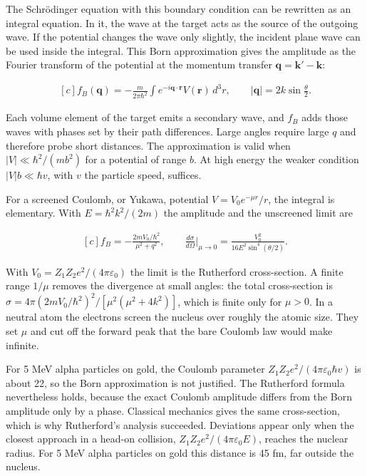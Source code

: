 \documentclass[11pt,oneside]{book}
\newenvironment{centeredalign}{\[\begin{gathered}[c]}{\end{gathered}\]}
\begin{document}
The Schrödinger equation with this boundary condition can be rewritten as an integral equation. In it, the wave at the target acts as the source of the outgoing wave. If the potential changes the wave only slightly, the incident plane wave can be used inside the integral. This Born approximation gives the amplitude as the Fourier transform of the potential at the momentum transfer \(\mathbf q=\mathbf k'-\mathbf k\):

\begin{centeredalign}
f_B(\mathbf q)=-\frac{m}{2\pi\hbar^2}\int e^{-i\mathbf q\cdot\mathbf r}V(\mathbf r)\,d^3r,
\qquad |\mathbf q|=2k\sin\frac\theta2.
\end{centeredalign}

Each volume element of the target emits a secondary wave, and \(f_B\) adds those waves with phases set by their path differences. Large angles require large \(q\) and therefore probe short distances. The approximation is valid when \(|V|\ll\hbar^2/(mb^2)\) for a potential of range \(b\). At high energy the weaker condition \(|V|b\ll\hbar v\), with \(v\) the particle speed, suffices.

For a screened Coulomb, or Yukawa, potential \(V=V_0e^{-\mu r}/r\), the integral is elementary. With \(E=\hbar^2k^2/(2m)\) the amplitude and the unscreened limit are

\begin{centeredalign}
f_B=-\frac{2mV_0/\hbar^2}{\mu^2+q^2},\qquad
\frac{d\sigma}{d\Omega}\Big|_{\mu\to0}=\frac{V_0^2}{16E^2\sin^4(\theta/2)}.
\end{centeredalign}

With \(V_0=Z_1Z_2e^2/(4\pi\varepsilon_0)\) the limit is the Rutherford cross-section. A finite range \(1/\mu\) removes the divergence at small angles: the total cross-section is \(\sigma=4\pi(2mV_0/\hbar^2)^2/[\mu^2(\mu^2+4k^2)]\), which is finite only for \(\mu>0\). In a neutral atom the electrons screen the nucleus over roughly the atomic size. They set \(\mu\) and cut off the forward peak that the bare Coulomb law would make infinite.

For 5 MeV alpha particles on gold, the Coulomb parameter \(Z_1Z_2e^2/(4\pi\varepsilon_0\hbar v)\) is about 22, so the Born approximation is not justified. The Rutherford formula nevertheless holds, because the exact Coulomb amplitude differs from the Born amplitude only by a phase. Classical mechanics gives the same cross-section, which is why Rutherford's analysis succeeded. Deviations appear only when the closest approach in a head-on collision, \(Z_1Z_2e^2/(4\pi\varepsilon_0E)\), reaches the nuclear radius. For 5 MeV alpha particles on gold this distance is 45 fm, far outside the nucleus.
\end{document}
